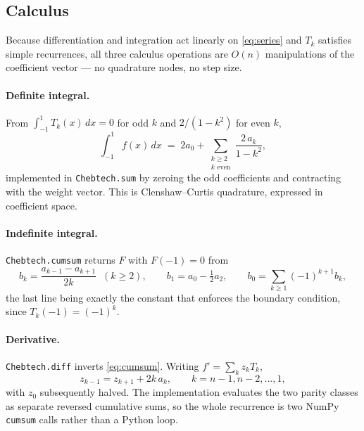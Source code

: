 \documentclass[11pt,a4paper]{article}
\newcommand{\cheb}[1]{T_{#1}}
\newcommand{\code}[1]{\texttt{#1}}
\begin{document}
\subsection{Calculus}
\label{sec:calculus}

Because differentiation and integration act linearly on \eqref{eq:series} and
$\cheb{k}$ satisfies simple recurrences, all three calculus operations are
$O(n)$ manipulations of the coefficient vector --- no quadrature nodes, no step
size.

\paragraph{Definite integral.}
From $\int_{-1}^{1} \cheb{k}(x)\,dx = 0$ for odd $k$ and $2/(1-k^2)$ for even
$k$,
\begin{equation}
  \int_{-1}^{1} f(x)\,dx
    \;=\; 2a_0 + \sum_{\substack{k \ge 2 \\ k \text{ even}}}
          \frac{2\,a_k}{1 - k^2},
  \label{eq:sum}
\end{equation}
implemented in \code{Chebtech.sum} by zeroing the odd coefficients and
contracting with the weight vector. This is Clenshaw--Curtis quadrature,
expressed in coefficient space.

\paragraph{Indefinite integral.}
\code{Chebtech.cumsum} returns $F$ with $F(-1) = 0$ from
\begin{equation}
  b_k = \frac{a_{k-1} - a_{k+1}}{2k} \;\; (k \ge 2),
  \qquad
  b_1 = a_0 - \tfrac{1}{2} a_2,
  \qquad
  b_0 = \sum_{k \ge 1} (-1)^{k+1} b_k ,
  \label{eq:cumsum}
\end{equation}
the last line being exactly the constant that enforces the boundary condition,
since $\cheb{k}(-1) = (-1)^k$.

\paragraph{Derivative.}
\code{Chebtech.diff} inverts \eqref{eq:cumsum}. Writing $f' = \sum_k z_k
\cheb{k}$,
\begin{equation}
  z_{k-1} = z_{k+1} + 2k\,a_k, \qquad k = n-1, n-2, \ldots, 1,
  \label{eq:diff}
\end{equation}
with $z_0$ subsequently halved. The implementation evaluates the two parity
classes as separate reversed cumulative sums, so the whole recurrence is two
NumPy \code{cumsum} calls rather than a Python loop.
\end{document}
